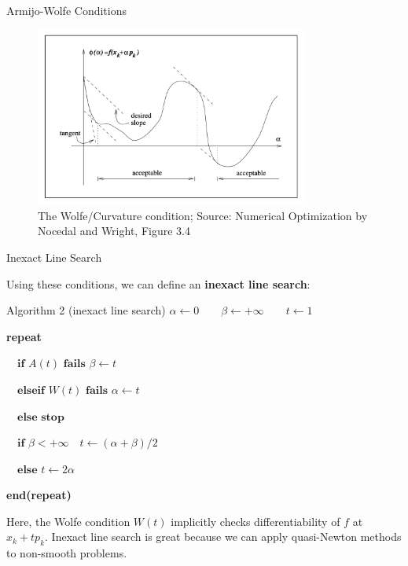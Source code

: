 \documentclass{beamer}
\begin{document}
\begin{frame}{Armijo-Wolfe Conditions}
     {
        \begin{figure}
            \centering
            \includegraphics[width=0.8\textwidth]{plots/wolfe_condition.png}
            \caption{The Wolfe/Curvature condition;
                Source: Numerical Optimization by Nocedal and Wright,
                Figure 3.4}
            \label{fig:wolfe_condition}
        \end{figure}
    }
\end{frame}

\begin{frame}{Inexact Line Search}
     {
        Using these conditions,
        we can define an \textbf{inexact line search}:
        \begin{block}{Algorithm 2 (inexact line search)}
            $\alpha \gets 0 \qquad \beta \gets +\infty \qquad t \gets 1$

            \textbf{repeat}

            $\quad \textbf{if } A(t) \textbf{ fails } \beta \gets t$

            $\quad \textbf{elseif } W(t) \textbf{ fails } \alpha \gets t$

            $\quad \textbf{else  stop}$

            $\quad \textbf{if } \beta < +\infty \quad t \gets (\alpha + \beta)/2$

            $\quad \textbf{else }  t \gets 2\alpha$

            \textbf{end(repeat)}
        \end{block}
    }
     {
        Here, the Wolfe condition $W(t)$ implicitly
        checks differentiability of $f$ at $x_k + t p_k$.
    }
     {
        Inexact line search is great because we can apply
        quasi-Newton methods to non-smooth problems.
    }
\end{frame}
\end{document}
